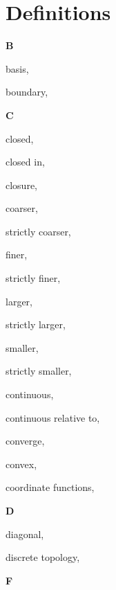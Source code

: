 \section*{Definitions}

\begin{multicols}{2}

\vspace{1em}\large{\textbf{B}}

basis, \pageref{def:Basis}

boundary, \pageref{def:Boundary}

\vspace{1em}\large{\textbf{C}}

closed, \pageref{def:Closed}

\hspace{1em}closed in, \pageref{def:ClosedIn}

closure, \pageref{def:Closure}

coarser, \pageref{def:Comparable}

\hspace{1em}strictly coarser, \pageref{def:Comparable}

finer, \pageref{def:Comparable}

\hspace{1em}strictly finer, \pageref{def:Comparable}

larger, \pageref{def:Comparable}

\hspace{1em}strictly larger, \pageref{def:Comparable}

smaller, \pageref{def:Comparable}

\hspace{1em}strictly smaller, \pageref{def:Comparable}

continuous, \pageref{def:Continuous}

\hspace{1em}continuous relative to, \pageref{def:ContinuousRelativeTo}

converge, \pageref{def:Converge}

convex, \pageref{def:Convex}

coordinate functions, \pageref{def:CoordinateFunctions}

\vspace{1em}\large{\textbf{D}}

diagonal, \pageref{def:Diagonal}

discrete topology, \pageref{def:DiscreteTopology}

\vspace{1em}\large{\textbf{F}}


\end{multicols}
